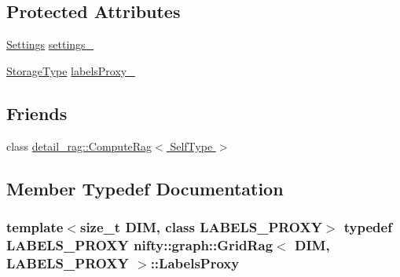 \subsection*{Protected Attributes}
\begin{DoxyCompactItemize}
\item 
\hyperlink{structnifty_1_1graph_1_1GridRag_1_1Settings}{Settings} \hyperlink{classnifty_1_1graph_1_1GridRag_af18452ee8060f7bb0fa527da6c2fc3a5}{settings\+\_\+}
\item 
\hyperlink{classnifty_1_1graph_1_1GridRag_ae7dcf657b20ef49d062648978e192cdb}{Storage\+Type} \hyperlink{classnifty_1_1graph_1_1GridRag_abaacb5cd2582a08e27ec4af04f5e9881}{labels\+Proxy\+\_\+}
\end{DoxyCompactItemize}
\subsection*{Friends}
\begin{DoxyCompactItemize}
\item 
class \hyperlink{classnifty_1_1graph_1_1GridRag_abafcbd3543961eb6e4ee794aa6a62d66}{detail\+\_\+rag\+::\+Compute\+Rag$<$ Self\+Type $>$}
\end{DoxyCompactItemize}


\subsection{Member Typedef Documentation}
\hypertarget{classnifty_1_1graph_1_1GridRag_ad3146f72301da4f45b51e3b692776cf1}{}
\subsubsection[{Labels\+Proxy}]{\setlength{\rightskip}{0pt plus 5cm}template$<$size\+\_\+t D\+I\+M, class L\+A\+B\+E\+L\+S\+\_\+\+P\+R\+O\+X\+Y$>$ typedef L\+A\+B\+E\+L\+S\+\_\+\+P\+R\+O\+X\+Y {\bf nifty\+::graph\+::\+Grid\+Rag}$<$ D\+I\+M, L\+A\+B\+E\+L\+S\+\_\+\+P\+R\+O\+X\+Y $>$\+::{\bf Labels\+Proxy}}\label{classnifty_1_1graph_1_1GridRag_ad3146f72301da4f45b51e3b692776cf1}
\hypertarget{classnifty_1_1graph_1_1GridRag_aa5e47cff6ae70d13254abc3382b3b166}{}
